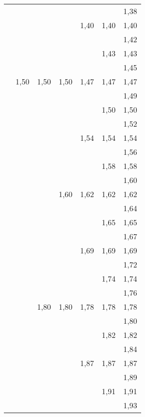 \begin{tiny}
\begin{tabular}{@{}c@{ }c@{ }c@{ }c@{ }c@{ }c@{ }c}
     &      &      &      &      &      & 1,38 \\
     &      &      &      & 1,40 & 1,40 & 1,40 \\
     &      &      &      &      &      & 1,42 \\
     &      &      &      &      & 1,43 & 1,43 \\
     &      &      &      &      &      & 1,45 \\
     & 1,50 & 1,50 & 1,50 & 1,47 & 1,47 & 1,47 \\
     &      &      &      &      &      & 1,49 \\
     &      &      &      &      & 1,50 & 1,50 \\
     &      &      &      &      &      & 1,52 \\
     &      &      &      & 1,54 & 1,54 & 1,54 \\
     &      &      &      &      &      & 1,56 \\
     &      &      &      &      & 1,58 & 1,58 \\
     &      &      &      &      &      & 1,60 \\
     &      &      & 1,60 & 1,62 & 1,62 & 1,62 \\
     &      &      &      &      &      & 1,64 \\
     &      &      &      &      & 1,65 & 1,65 \\
     &      &      &      &      &      & 1,67 \\
     &      &      &      & 1,69 & 1,69 & 1,69 \\
     &      &      &      &      &      & 1,72 \\
     &      &      &      &      & 1,74 & 1,74 \\
     &      &      &      &      &      & 1,76 \\
     &      & 1,80 & 1,80 & 1,78 & 1,78 & 1,78 \\
     &      &      &      &      &      & 1,80 \\
     &      &      &      &      & 1,82 & 1,82 \\
     &      &      &      &      &      & 1,84 \\
     &      &      &      & 1,87 & 1,87 & 1,87 \\
     &      &      &      &      &      & 1,89 \\
     &      &      &      &      & 1,91 & 1,91 \\
     &      &      &      &      &      & 1,93 \\

\end{tabular}
\end{tiny}
